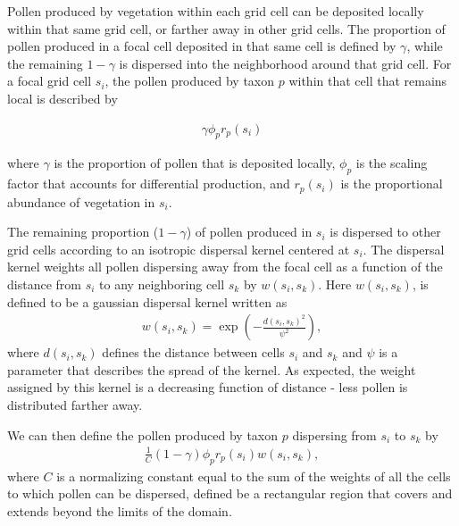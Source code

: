 \documentclass[12pt]{article}
\begin{document}
Pollen produced by vegetation within each grid cell can be deposited
locally within that same grid cell, or farther away in other grid
cells. The proportion of pollen produced in a focal cell
deposited in that same cell is defined by $\gamma$, while the
remaining $1-\gamma$ is dispersed into the neighborhood around that
grid cell. For a focal grid cell $s_i$, the pollen produced by taxon
$p$ within that cell that remains local is described by

\begin{align}
\gamma \phi_p r_p(s_i)
\end{align} 

where $\gamma$ is the proportion of pollen that is deposited locally,
$\phi_p$ is the scaling factor that accounts for differential
production, and $r_p(s_i)$ is the proportional abundance of vegetation
in $s_i$.

The remaining proportion ($1-\gamma$) of pollen produced in $s_i$ is
dispersed to other grid cells according to an isotropic dispersal
kernel centered at $s_i$. The dispersal kernel weights all pollen
dispersing away from the focal cell as a function of the distance from
$s_i$ to any neighboring cell $s_k$ by $w(s_i, s_k)$. Here $w(s_i,
s_k)$, is defined to be a gaussian dispersal kernel written as
\begin{align}
w(s_i, s_k) = \exp\left( - \frac{d(s_i, s_k)^2}{\psi^2} \right),
\end{align}
where $d(s_i,s_k)$ defines the distance between cells $s_i$ and $s_k$
and $\psi$ is a parameter that describes the spread of the kernel. As
expected, the weight assigned by this kernel is a decreasing function
of distance - less pollen is distributed farther away.

 
We can then define the pollen produced by taxon $p$ dispersing from
$s_i$ to $s_k$ by
\begin{align}
\frac{1}{C} (1-\gamma) \phi_p r_p(s_i) w(s_i, s_k),
\end{align}
where $C$ is a normalizing constant equal to the sum of the weights of
all the cells to which pollen can be dispersed, defined be a
rectangular region that covers and extends beyond the limits of the domain.

\end{document}
